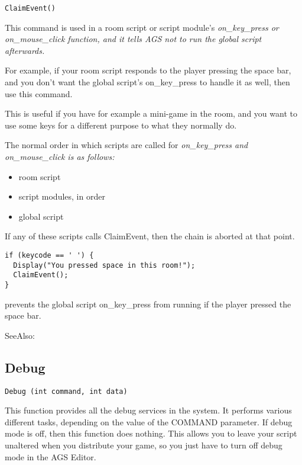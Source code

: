 \begin{verbatim}
ClaimEvent()
\end{verbatim}

This command is used in a room script or script module's \it{on_key_press} or
\it{on_mouse_click} function, and it tells AGS not to run the global script afterwards.

For example, if your room script responds to the player pressing the space bar, and
you don't want the global script's on_key_press to handle it as well, then use this
command.

This is useful if you have for example a mini-game in the room, and you want to use
some keys for a different purpose to what they normally do.

The normal order in which scripts are called for \it{on_key_press} and \it{on_mouse_click}
is as follows:
\begin{itemize}
\item room script
\item script modules, in order
\item global script
\end{itemize}
If any of these scripts calls ClaimEvent, then the chain is aborted at that point.

\begin{verbatim}
if (keycode == ' ') {
  Display("You pressed space in this room!");
  ClaimEvent();
}
\end{verbatim}
prevents the global script on_key_press from running if the player pressed the space bar.

SeeAlso: 



\subsection{Debug}\label{Debug}%

\begin{verbatim}
Debug (int command, int data)
\end{verbatim}
This function provides all the debug services in the system. It performs
various different tasks, depending on the value of the COMMAND parameter.
If debug mode is off, then this function does nothing. This allows you to
leave your script unaltered when you distribute your game, so you just have
to turn off debug mode in the AGS Editor.

